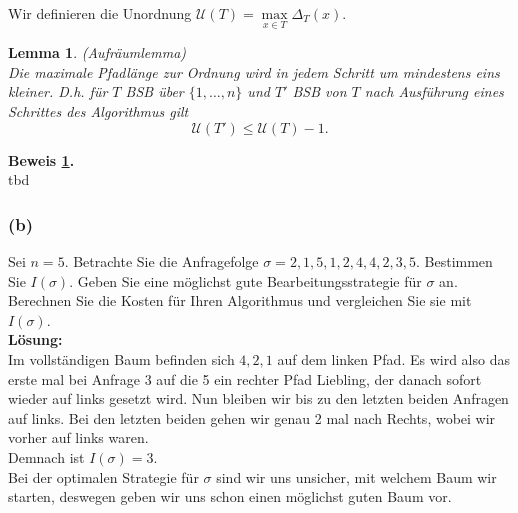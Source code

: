 \documentclass[11pt,a4paper,ngerman]{article}
\newtheorem{lemmas}[propo]{Lemma}
\begin{document}
Wir definieren die Unordnung $\mathcal{U}(T) = \underset{x \in T}{\max} \Delta_T(x)$.\\

\begin{lemmas} \label{ads:ueb3:aufr} (Aufräumlemma)\\
   Die maximale Pfadlänge zur Ordnung wird in jedem Schritt um mindestens eins kleiner.   D.h. für $T$ BSB über $\{1, \ldots, n\}$ und $T'$ BSB von $T$ nach Ausführung eines
   Schrittes des Algorithmus gilt
   $$
      \mathcal{U}(T') \leq \mathcal{U}(T) - 1.
   $$
\end{lemmas} 


\noindent\textbf{Beweis \ref{ads:ueb3:aufr}.}\\

tbd

\subsubsection*{(b)}

Sei $n=5$. Betrachte Sie die Anfragefolge $\sigma = 2,1,5,1,2,4,4,2,3,5$. Bestimmen Sie $I(\sigma)$. Geben Sie eine möglichst gute Bearbeitungsstrategie für $\sigma$ an. Berechnen Sie die Kosten für Ihren Algorithmus und vergleichen Sie sie mit $I(\sigma)$.\\

\noindent\textbf{Lösung:}\\

Im vollständigen Baum befinden sich $4,2,1$ auf dem linken Pfad. Es wird also das erste mal bei Anfrage $3$ auf die 5 ein rechter Pfad Liebling, der danach sofort wieder auf links gesetzt wird. Nun bleiben wir bis zu den letzten beiden Anfragen auf links. Bei den letzten beiden gehen wir genau 2 mal nach Rechts, wobei wir vorher auf links waren.\\

Demnach ist $I(\sigma) = 3$.\\

Bei der optimalen Strategie für $\sigma$ sind wir uns unsicher, mit welchem Baum wir starten, deswegen geben wir uns schon einen möglichst guten Baum vor.
\end{document}
